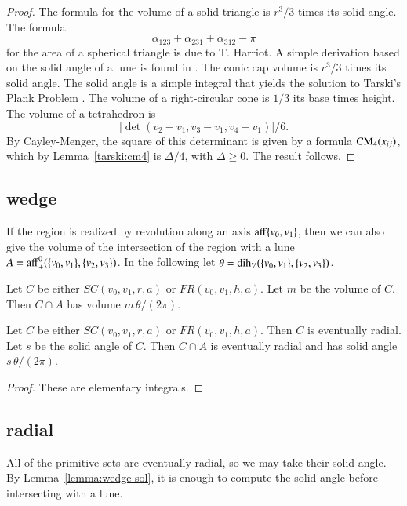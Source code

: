 \begin{proof}
The formula for the volume of a solid triangle is $r^3/3$ times
its solid angle.  The formula 
   $$\alpha_{123}+\alpha_{231}+\alpha_{312}-\pi$$
for the area of a spherical triangle is due to T. Harriot.  A
simple
derivation based on the solid angle of a lune
is found in \cite{EZ}.  The conic cap volume is
$r^3/3$ times its solid angle.  The solid angle is a simple
integral that yields the solution to Tarski's Plank Problem
\cite{EZ}.
The volume of a right-circular cone is $1/3$ its base times height.
The volume of a tetrahedron is
   $$|\det(v_2-v_1,v_3-v_1,v_4-v_1)|/6.$$
By Cayley-Menger, the square of this determinant is given by a formula
${\operatorname{CM}}_4(x_{ij})$, which by Lemma~\ref{tarski:cm4} is
$\Delta/4$, with $\Delta\ge0$.  The result follows.
\end{proof}



\subsection{wedge}

If the region is realized by revolution along an axis ${\operatorname{aff}}\{v_0,v_1\}$, 
then
we can also give the volume of the intersection of the region
with a lune $A={\operatorname{aff}}^0_+(\{v_0,v_1\},\{v_2,v_3\})$.  In the following
let $\theta = \operatorname{dih}_V(\{v_0,v_1\},\{v_2,v_3\})$.


\begin{lemma}\label{lemma:wedge-vol}  Let $C$ be either $SC(v_0,v_1,r,a)$ or
   $FR(v_0,v_1,h,a)$.  Let $m$ be the volume of $C$.  
   Then $C\cap A$ has volume $m\,\theta/(2\pi)$.   
\end{lemma}

\begin{lemma}\label{lemma:wedge-sol}  Let $C$ be either $SC(v_0,v_1,r,a)$ or
   $FR(v_0,v_1,h,a)$.  Then $C$ is eventually radial.  Let
   $s$ be the solid angle of $C$.  Then
    $C\cap A$ is eventually radial and has solid angle 
  $s\,\theta/(2\pi)$.
\end{lemma}


\begin{proof}
These are elementary integrals.
\end{proof}


\subsection{radial}

All of the primitive sets are eventually radial, so we may take their
solid angle.  By Lemma~\ref{lemma:wedge-sol}, it is enough to compute
the solid angle before intersecting with a lune.

